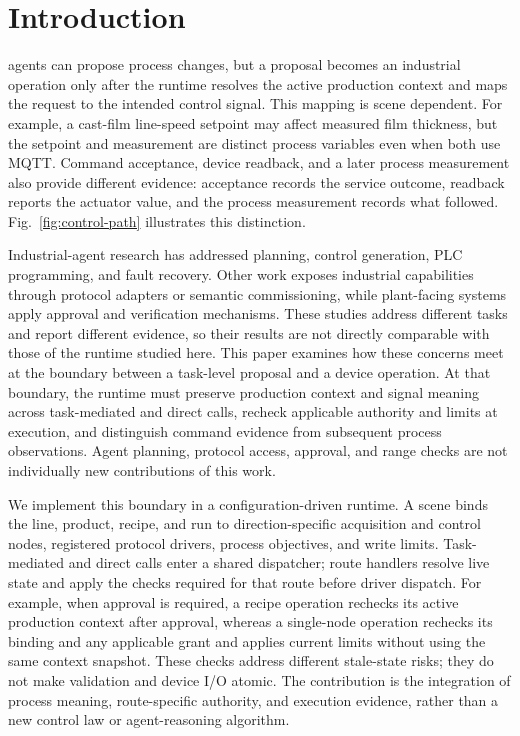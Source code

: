 \section{Introduction}
 agents can propose process changes, but a proposal becomes an industrial operation only after the runtime resolves the active production context and maps the request to the intended control signal. This mapping is scene dependent. For example, a cast-film line-speed setpoint may affect measured film thickness, but the setpoint and measurement are distinct process variables even when both use MQTT. Command acceptance, device readback, and a later process measurement also provide different evidence: acceptance records the service outcome, readback reports the actuator value, and the process measurement records what followed. Fig.~\ref{fig:control-path} illustrates this distinction.

Industrial-agent research has addressed planning, control generation, PLC programming, and fault recovery. Other work exposes industrial capabilities through protocol adapters or semantic commissioning, while plant-facing systems apply approval and verification mechanisms. These studies address different tasks and report different evidence, so their results are not directly comparable with those of the runtime studied here. This paper examines how these concerns meet at the boundary between a task-level proposal and a device operation. At that boundary, the runtime must preserve production context and signal meaning across task-mediated and direct calls, recheck applicable authority and limits at execution, and distinguish command evidence from subsequent process observations. Agent planning, protocol access, approval, and range checks are not individually new contributions of this work.

We implement this boundary in a configuration-driven runtime. A scene binds the line, product, recipe, and run to direction-specific acquisition and control nodes, registered protocol drivers, process objectives, and write limits. Task-mediated and direct calls enter a shared dispatcher; route handlers resolve live state and apply the checks required for that route before driver dispatch. For example, when approval is required, a recipe operation rechecks its active production context after approval, whereas a single-node operation rechecks its binding and any applicable grant and applies current limits without using the same context snapshot. These checks address different stale-state risks; they do not make validation and device I/O atomic. The contribution is the integration of process meaning, route-specific authority, and execution evidence, rather than a new control law or agent-reasoning algorithm.

